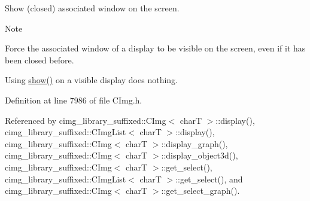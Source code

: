 Show (closed) associated window on the screen. 

\begin{DoxyNote}{Note}

\begin{DoxyItemize}
\item Force the associated window of a display to be visible on the screen, even if it has been closed before.
\item Using \hyperlink{structcimg__library__suffixed_1_1CImgDisplay_a40569e73fec12daeec84942b0d0f1b6d}{show()} on a visible display does nothing. 
\end{DoxyItemize}
\end{DoxyNote}


Definition at line 7986 of file C\+Img.\+h.



Referenced by cimg\+\_\+library\+\_\+suffixed\+::\+C\+Img$<$ char\+T $>$\+::display(), cimg\+\_\+library\+\_\+suffixed\+::\+C\+Img\+List$<$ char\+T $>$\+::display(), cimg\+\_\+library\+\_\+suffixed\+::\+C\+Img$<$ char\+T $>$\+::display\+\_\+graph(), cimg\+\_\+library\+\_\+suffixed\+::\+C\+Img$<$ char\+T $>$\+::display\+\_\+object3d(), cimg\+\_\+library\+\_\+suffixed\+::\+C\+Img$<$ char\+T $>$\+::get\+\_\+select(), cimg\+\_\+library\+\_\+suffixed\+::\+C\+Img\+List$<$ char\+T $>$\+::get\+\_\+select(), and cimg\+\_\+library\+\_\+suffixed\+::\+C\+Img$<$ char\+T $>$\+::get\+\_\+select\+\_\+graph().

